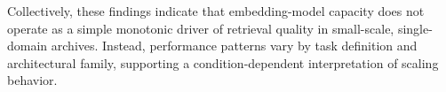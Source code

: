 Collectively, these findings indicate that embedding-model capacity does not operate as a simple monotonic driver of retrieval quality in small-scale, single-domain archives. Instead, performance patterns vary by task definition and architectural family, supporting a condition-dependent interpretation of scaling behavior.

